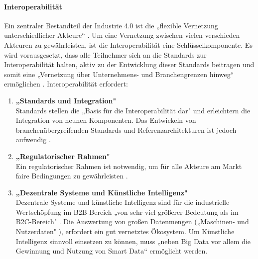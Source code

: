 \paragraph{Interoperabilität}\label{sec:Interoperabilität}
\noindent Ein zentraler Bestandteil der Industrie 4.0 ist die „flexible Vernetzung unterschiedlicher Akteure“ \cite[S.5]{3}. Um eine Vernetzung zwischen vielen verschieden Akteuren zu gewährleisten, ist die Interoperabilität eine Schlüsselkomponente. Es wird vorausgesetzt, dass alle Teilnehmer sich an die Standards zur Interoperabilität halten, aktiv zu der Entwicklung dieser Standards beitragen und somit eine „Vernetzung über Unternehmens- und Branchengrenzen hinweg“ \cite[S.5]{3} ermöglichen \cite[S.5]{3}. Interoperabilität erfordert:
\begin{enumerate}
	\item \textbf{„Standards und Integration"} \cite[S.5]{3} \\
	Standards stellen die „Basis für die Interoperabilität dar" \cite[S.5]{3} und erleichtern die Integration von neunen Komponenten. Das Entwickeln von branchenübergreifenden Standards und
	Referenzarchitekturen ist jedoch aufwendig \cite[S.5]{3}.
	\item \textbf{„Regulatorischer Rahmen"} \cite[S.5]{3} \\
	Ein regulatorischer Rahmen ist notwendig, um für alle Akteure am Markt faire Bedingungen zu gewährleisten \cite[S.5]{3}.
	\item \textbf{„Dezentrale Systeme und Künstliche Intelligenz"} \cite[S.5]{3} \\
	Dezentrale Systeme und künstliche Intelligenz sind für die industrielle Wertschöpfung im 
	B2B-Bereich „von sehr viel größerer Bedeutung als im B2C-Bereich" \cite[S.5]{3}. Die Auswertung von großen Datenmengen („Maschinen- und Nutzerdaten" \cite[S.5]{3}), erfordert ein gut vernetztes Ökosystem. Um Künstliche Intelligenz sinnvoll einsetzen zu können, muss „neben Big Data vor allem die Gewinnung und Nutzung von Smart Data“ \cite[S.5]{3} ermöglicht werden.
\end{enumerate}

